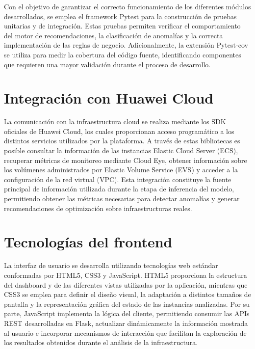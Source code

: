 Con el objetivo de garantizar el correcto funcionamiento de los
diferentes módulos desarrollados, se emplea el framework Pytest para la
construcción de pruebas unitarias y de integración. Estas pruebas
permiten verificar el comportamiento del motor de recomendaciones, la
clasificación de anomalías y la correcta implementación de las reglas de
negocio. Adicionalmente, la extensión Pytest-cov se utiliza para medir
la cobertura del código fuente, identificando componentes que requieren
una mayor validación durante el proceso de desarrollo.

\section{Integración con Huawei Cloud}

La comunicación con la infraestructura cloud se realiza mediante los SDK
oficiales de Huawei Cloud, los cuales proporcionan acceso programático a
los distintos servicios utilizados por la plataforma. A través de estas
bibliotecas es posible consultar la información de las instancias
Elastic Cloud Server (ECS), recuperar métricas de monitoreo mediante
Cloud Eye, obtener información sobre los volúmenes administrados por
Elastic Volume Service (EVS) y acceder a la configuración de la red
virtual (VPC). Esta integración constituye la fuente principal de
información utilizada durante la etapa de inferencia del modelo,
permitiendo obtener las métricas necesarias para detectar anomalías y
generar recomendaciones de optimización sobre infraestructuras reales.

\section{Tecnologías del frontend}

La interfaz de usuario se desarrolla utilizando tecnologías web estándar
conformadas por HTML5, CSS3 y JavaScript. HTML5 proporciona la
estructura del dashboard y de las diferentes vistas utilizadas por la
aplicación, mientras que CSS3 se emplea para definir el diseño visual,
la adaptación a distintos tamaños de pantalla y la representación
gráfica del estado de las instancias analizadas. Por su parte,
JavaScript implementa la lógica del cliente, permitiendo consumir las
APIs REST desarrolladas en Flask, actualizar dinámicamente la
información mostrada al usuario e incorporar mecanismos de interacción
que facilitan la exploración de los resultados obtenidos durante el
análisis de la infraestructura.

